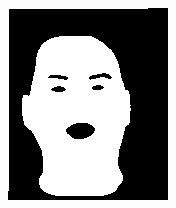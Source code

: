 \begin{figure}[h]
\begin{subfigure}[b]{0.18\textwidth}
         \includegraphics[width=\textwidth]{images/results/base_st/dd121.color.d3_skinny_13.png}
     \end{subfigure}
    \hfill
     \begin{subfigure}[b]{0.18\textwidth}
         \centering

\end{subfigure}
\end{figure}
